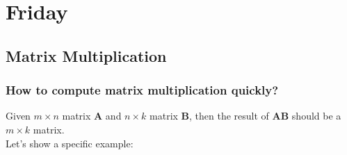 
\section{Friday}

\subsection{Matrix Multiplication}
\subsubsection{How to compute matrix multiplication quickly?}
\enlargethispage{1cm}
Given $m\times n$ matrix $\bm A$ and $n\times k$ matrix $\bm B$, then the result of $\bm{AB}$ should be a $m\times k$ matrix.\\
Let’s show a specific example:
